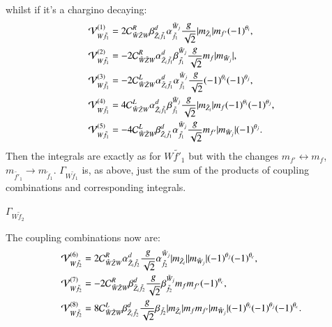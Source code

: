 \documentclass[final,3p,times,pdflatex]{elsarticle}
\begin{document}
whilst if it's a chargino decaying:
\begin{align}
\mathcal{V}_{W \tilde{f}_1}^{(1)} &= 2 \mathcal{C}_{\tilde{W} \tilde{Z} W}^R \beta_{\tilde{Z}_i \tilde{f}_1}^{d} \alpha_{\tilde{f}_1}^{\tilde{W}_j}{g \over \sqrt{2}} |m_{\tilde{Z}_i}| m_{f'}(-1)^{\theta_i}, \\
\mathcal{V}_{W \tilde{f}_1}^{(2)} &= -2 \mathcal{C}_{\tilde{W} \tilde{Z} W}^R \alpha_{\tilde{Z}_i \tilde{f}_1}^{d} \beta_{\tilde{f}_1}^{\tilde{W}_j}{g \over \sqrt{2}} m_{f} |m_{\tilde{W}_j}|, \\
\mathcal{V}_{W \tilde{f}_1}^{(3)} &= -2 \mathcal{C}_{\tilde{W} \tilde{Z} W}^L \alpha_{\tilde{Z}_i \tilde{f}_1}^{d} \alpha_{\tilde{f}_1}^{\tilde{W}_j}{g \over \sqrt{2}} (-1)^{\theta_i}(-1)^{\theta_j}, \\
\mathcal{V}_{W \tilde{f}_1}^{(4)} &= 4 \mathcal{C}_{\tilde{W} \tilde{Z} W}^L \alpha_{\tilde{Z}_i \tilde{f}_1}^{d} \beta_{\tilde{f}_1}^{\tilde{W}_j} {g \over \sqrt{2}} |m_{\tilde{Z}_i}|m_{f}(-1)^{\theta_i}(-1)^{\theta_j}, \\
\mathcal{V}_{W \tilde{f}_1}^{(5)} &= -4 \mathcal{C}_{\tilde{W} \tilde{Z} W}^L \beta_{\tilde{Z}_i \tilde{f}_1}^{d} \alpha_{\tilde{f}_1}^{\tilde{W}_j}{g \over \sqrt{2}}m_{f'}|m_{\tilde{W}_j}|(-1)^{\theta_j}.
\end{align}
Then the integrals are exactly as for $W \tilde{f'}_1$ but with the changes $m_{f'} \leftrightarrow m_{f}$, $m_{\tilde{f'}_1} \rightarrow m_{\tilde{f}_1}$. $\Gamma_{W \tilde{f}_1}$ is, as above, just the sum of the products of coupling combinations and corresponding integrals.

\textbf{\underline{$\Gamma_{W \tilde{f}_2}$}}

The coupling combinations now are:
\begin{align}
\mathcal{V}_{W \tilde{f}_2}^{(6)} &= 2 \mathcal{C}_{\tilde{W} \tilde{Z} W}^R \alpha_{\tilde{Z}_i \tilde{f}_2}^{d} {g \over \sqrt{2}} \alpha_{\tilde{f}_2}^{\tilde{W}_j} |m_{\tilde{Z}_i}||m_{\tilde{W}_j}|(-1)^{\theta_j}(-1)^{\theta_c}, \\
\mathcal{V}_{W \tilde{f}_2}^{(7)} &= -2 \mathcal{C}_{\tilde{W} \tilde{Z} W}^R \beta_{\tilde{Z}_i \tilde{f}_2}^{d} {g \over \sqrt{2}} \beta_{\tilde{f}_2}^{\tilde{W}_j}m_{f}m_{f'}(-1)^{\theta_c}, \\
\mathcal{V}_{W \tilde{f}_2}^{(8)} &= 8 \mathcal{C}_{\tilde{W} \tilde{Z} W}^L \beta_{\tilde{Z}_i \tilde{f}_2}^{d} {g \over \sqrt{2}} \beta_{\tilde{f}_2} |m_{\tilde{Z}_i}|m_{f}m_{f'}|m_{\tilde{W}_j}|(-1)^{\theta_i}(-1)^{\theta_j}(-1)^{\theta_c}.
\end{align}
\end{document}
